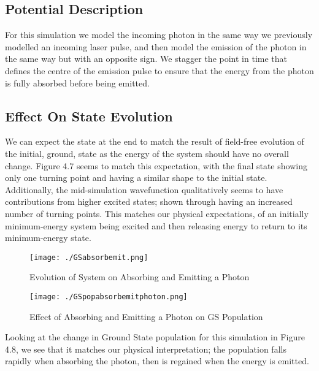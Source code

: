 \subsection{Potential Description}
For this simulation we model the incoming photon in the same way we previously modelled an incoming laser pulse, and then model the emission of the photon in the same way but with an opposite sign. We stagger the point in time that defines the centre of the emission pulse to ensure that the energy from the photon is fully absorbed before being emitted. 

\subsection{Effect On State Evolution}
We can expect the state at the end to match the result of field-free evolution of the initial, ground, state as the energy of the system should have no overall change. Figure 4.7 seems to match this expectation, with the final state showing only one turning point and having a similar shape to the initial state. Additionally, the mid-simulation wavefunction qualitatively seems to have contributions from higher excited states; shown through having an increased number of turning points. This matches our physical expectations, of an initially minimum-energy system being excited and then releasing energy to return to its minimum-energy state.

\begin{figure}[H]
          \texttt{[image: ./GSabsorbemit.png]}
          \centering
          \caption{Evolution of System on Absorbing and Emitting a Photon}
\end{figure}

\begin{figure}[H]
          \texttt{[image: ./GSpopabsorbemitphoton.png]}
          \centering
          \caption{Effect of Absorbing and Emitting a Photon on GS Population}
\end{figure}
Looking at the change in Ground State population for this simulation in Figure 4.8, we see that it matches our physical interpretation; the population falls rapidly when absorbing the photon, then is regained when the energy is emitted. 

